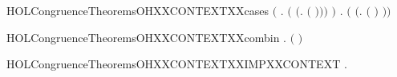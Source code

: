 \begin{SaveVerbatim}{HOLCongruenceTheoremsOHXXCONTEXTXXcases}
       \ensuremath{(}\HOLSymConst{\HOLTokenExists{}} . \ensuremath{(} \HOLSymConst{\ensuremath{=}} \ensuremath{(}\HOLTokenLambda{}.   \ensuremath{(} \ensuremath{)}\ensuremath{)}\ensuremath{)} \HOLSymConst{\HOLTokenConj{}}  \ensuremath{)} \HOLSymConst{\HOLTokenDisj{}}
       \HOLSymConst{\HOLTokenExists{}} . \ensuremath{(} \HOLSymConst{\ensuremath{=}} \ensuremath{(}\HOLTokenLambda{}.  \ensuremath{(} \ensuremath{)} \ensuremath{)}\ensuremath{)} \HOLSymConst{\HOLTokenConj{}}  
\end{SaveVerbatim}
\newcommand{\HOLCongruenceTheoremsOHXXCONTEXTXXcases}{\UseVerbatim{HOLCongruenceTheoremsOHXXCONTEXTXXcases}}
\begin{SaveVerbatim}{HOLCongruenceTheoremsOHXXCONTEXTXXcombin}
\HOLTokenTurnstile{} \HOLSymConst{\HOLTokenForall{}} .   \HOLSymConst{\HOLTokenConj{}}   \HOLSymConst{\HOLTokenImp{}}  \ensuremath{(} \HOLConst{\HOLTokenCompose} \ensuremath{)}
\end{SaveVerbatim}
\newcommand{\HOLCongruenceTheoremsOHXXCONTEXTXXcombin}{\UseVerbatim{HOLCongruenceTheoremsOHXXCONTEXTXXcombin}}
\begin{SaveVerbatim}{HOLCongruenceTheoremsOHXXCONTEXTXXIMPXXCONTEXT}
\HOLTokenTurnstile{} \HOLSymConst{\HOLTokenForall{}}.   \HOLSymConst{\HOLTokenImp{}}  
\end{SaveVerbatim}
\newcommand{\HOLCongruenceTheoremsOHXXCONTEXTXXIMPXXCONTEXT}{\UseVerbatim{HOLCongruenceTheoremsOHXXCONTEXTXXIMPXXCONTEXT}}
